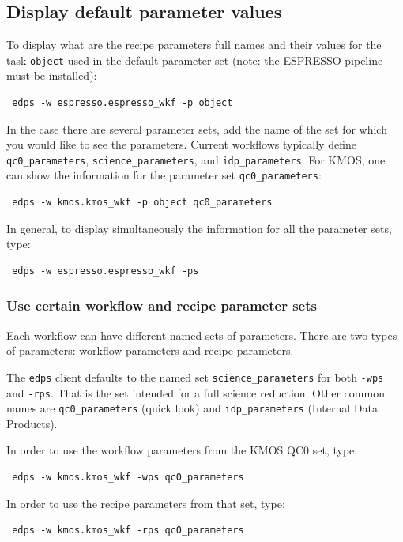 \subsection{Display default parameter values}
\label{sec:edps_default_params}
To display what are the recipe parameters full names and their values for the task {\tt object} used in the default parameter set (note: the ESPRESSO pipeline must be installed):

\begin{verbatim}
 edps -w espresso.espresso_wkf -p object
\end{verbatim}

In the case there are several parameter sets, add the name of the set for which you would like to see the parameters. Current workflows typically define {\tt qc0\_parameters}, {\tt science\_parameters}, and {\tt idp\_parameters}. For KMOS, one can show the information for the parameter set {\tt qc0\_parameters}:

\begin{verbatim}
 edps -w kmos.kmos_wkf -p object qc0_parameters
\end{verbatim}

In general, to display simultaneously the information for all the parameter sets, type:

\begin{verbatim}
 edps -w espresso.espresso_wkf -ps
\end{verbatim}

\subsubsection{Use certain workflow and recipe parameter sets}
\label{sec:edps_parameter_sets}
Each workflow can have different named sets of parameters. There are two types of parameters: workflow parameters and recipe parameters.

The {\tt edps} client defaults to the named set {\tt science\_parameters} for both {\tt -wps} and {\tt -rps}. That is the set intended for a full science reduction. Other common names are {\tt qc0\_parameters} (quick look) and {\tt idp\_parameters} (Internal Data Products).

In order to use the workflow parameters from the KMOS QC0 set, type: 
\begin{verbatim}
 edps -w kmos.kmos_wkf -wps qc0_parameters
\end{verbatim}

In order to use the recipe parameters from that set, type: 
\begin{verbatim}
 edps -w kmos.kmos_wkf -rps qc0_parameters
\end{verbatim}


